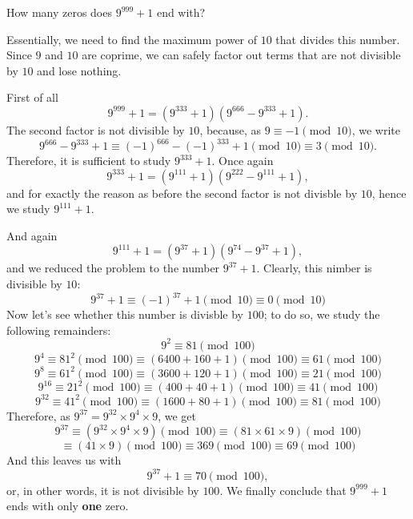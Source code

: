 \documentclass[a4paper, 12pt]{article}
\newcommand\pmt{\pmod {10}}
\newcommand\pmtt{\pmod {100}}
\begin{document}
How many zeros does $9^{999}+1$ end with?

Essentially, we need to find the maximum power of $10$ that divides this number.
Since $9$ and $10$ are coprime, we can safely factor out terms that are not divisible by $10$ and lose nothing.

First of all
\[
9^{999} +1 = (9^{333}+1)(9^{666} - 9 ^{333} + 1).
\]
The second factor is not divisible by $10$, because, as $9\equiv-1 \pmt$, we write
\[
    9^{666} - 9 ^{333} + 1 \equiv (-1)^{666} - (-1)^{333} + 1 \pmt \equiv 3 \pmt.
\]
Therefore, it is sufficient to study $9^{333}+1$.
Once again
\[
9^{333} +1 = (9^{111}+1)(9^{222} - 9 ^{111} + 1),
\]
and for exactly the reason as before the second factor is not divisble by $10$, hence we study $9^{111}+1$.

And again
\[
9^{111} +1 = (9^{37}+1)(9^{74} - 9 ^{37} + 1),
\]
and we reduced the problem to the number $9^{37}+1$.
Clearly, this nimber is divisible by $10$:
\[
    9^{37}+1 \equiv (-1)^{37} + 1 \pmt \equiv 0 \pmt
\]
Now let's see whether this number is divisble by $100$; to do so, we study the following remainders:
\[ 9^2 \equiv 81 \pmtt\]
\[ 9^4 \equiv 81^2 \pmtt \equiv (6400 + 160 + 1) \pmtt \equiv 61 \pmtt\]
\[ 9^8 \equiv 61^2 \pmtt \equiv (3600 + 120 + 1) \pmtt \equiv 21 \pmtt\]
\[ 9^{16} \equiv 21^2 \pmtt \equiv (400 + 40 + 1) \pmtt \equiv 41 \pmtt\]
\[ 9^{32} \equiv 41^2 \pmtt \equiv (1600 + 80 + 1) \pmtt \equiv 81 \pmtt\]
Therefore, as $9^{37} = 9^{32} \times 9^4 \times 9$, we get
\[9^{37} \equiv (9^{32} \times 9^4 \times 9) \pmtt \equiv (81 \times 61 \times 9) \pmtt\]
\[
\equiv (41 \times 9) \pmtt \equiv 369 \pmtt \equiv 69 \pmtt
\]
And this leaves us with
\[9^{37}+1 \equiv 70\pmtt,\]
or, in other words, it is not divisible by $100$.
We finally conclude that $9^{999}+1$ ends with only \textbf{one} zero.
\end{document}
